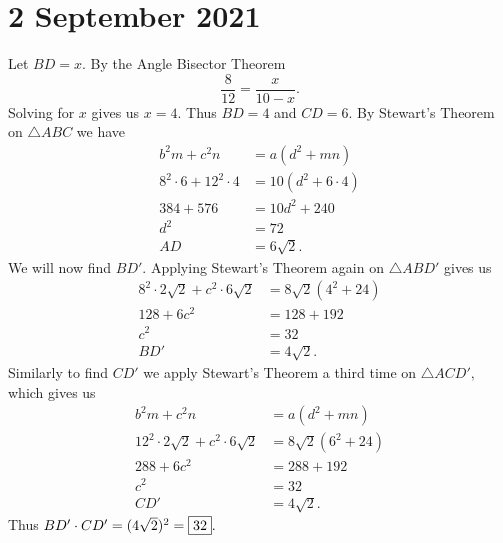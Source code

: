 \documentclass[letterpaper,oneside]{scrartcl}
\begin{document}
\section*{2 September 2021}
Let $BD =x.$ By the Angle Bisector Theorem
$$\frac{8}{12} = \frac{x}{10-x}.$$
Solving for $x$ gives us $x=4.$ Thus $BD=4$ and $CD=6.$ By Stewart's Theorem on $\triangle ABC$ we have
\begin{align*}
    b^2m+c^2n&=a(d^2+mn)\\
    8^2\cdot6+12^2\cdot4&=10(d^2+6\cdot4)\\
    384+576&=10d^2+240\\
    d^2&=72\\
    AD&=6\sqrt2.
\end{align*}
We will now find $BD'$. Applying Stewart's Theorem again on $\triangle ABD'$ gives us
\begin{align*}
    8^2\cdot2\sqrt2+c^2\cdot6\sqrt2&=8\sqrt2(4^2+24)\\
    128+6c^2&=128+192\\
    c^2&=32\\
    BD'&=4\sqrt2.
\end{align*}
Similarly to find $CD'$ we apply Stewart's Theorem a third time on $\triangle ACD',$ which gives us
\begin{align*}
    b^2m+c^2n&=a(d^2+mn)\\
    12^2\cdot2\sqrt2+c^2\cdot6\sqrt2&=8\sqrt2(6^2+24)\\
    288+6c^2&=288+192\\
    c^2&=32\\
    CD'&=4\sqrt2.
\end{align*}
Thus $BD'\cdot CD' = (4\sqrt2)^2=\fbox{32}.$
\newpage
\end{document}
